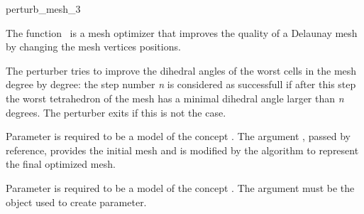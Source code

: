 \ccRefPageBegin


\begin{ccRefFunction}{perturb_mesh_3}  %


\ccDefinition
  
The function \ccRefName\ is a mesh optimizer that
 improves the quality of a Delaunay mesh
by changing the mesh vertices positions.

The perturber tries to improve the dihedral angles of the worst cells in the mesh
degree by degree: the
step  number \emph{n} is considered as successfull 
if after this step the worst tetrahedron of the mesh has a minimal dihedral
angle larger than \emph{n} degrees.
The perturber exits if this is not the case.




\ccParameters

Parameter  is required to be a model of the concept
.
The argument , passed by
reference, provides the initial mesh  
and is modified  by the algorithm 
to represent the final optimized mesh.

Parameter  is required to be a model of the concept
. The argument  must be the 
object used to create  parameter.


\end{ccRefFunction}
